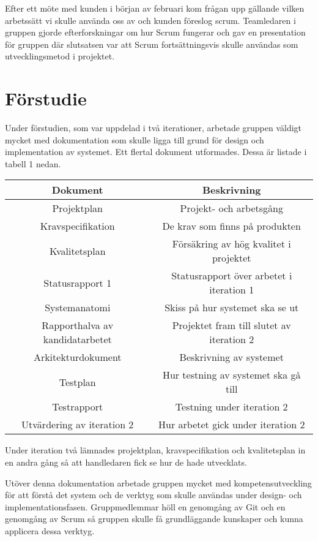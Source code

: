 Efter ett möte med kunden i början av februari kom frågan upp gällande vilken arbetssätt vi skulle använda oss av och kunden föreslog scrum. Teamledaren i gruppen gjorde efterforskningar om hur Scrum fungerar och gav en presentation för gruppen där slutsatsen var att Scrum fortsättningsvis skulle användas som utvecklingsmetod i projektet.

\section{Förstudie}
\label{sec:forstudie}
Under förstudien, som var uppdelad i två iterationer, arbetade gruppen väldigt mycket med dokumentation som skulle ligga till grund för design och implementation av systemet. Ett flertal dokument utformades. Dessa är listade i tabell 1 nedan.

\begin{center}
\begin{tabular}{|c|c|}
\hline
\textbf{Dokument} & \textbf{Beskrivning} \\
\hline
Projektplan & Projekt- och arbetsgång \\
\hline
Kravspecifikation & De krav som finns på produkten \\
\hline
Kvalitetsplan & Försäkring av hög kvalitet i projektet \\
\hline
Statusrapport 1 & Statusrapport över arbetet i iteration 1 \\
\hline
Systemanatomi & Skiss på hur systemet ska se ut \\
\hline
Rapporthalva av kandidatarbetet & Projektet fram till slutet av iteration 2 \\
\hline
Arkitekturdokument & Beskrivning av systemet \\
\hline
Testplan & Hur testning av systemet ska gå till \\
\hline
Testrapport & Testning under iteration 2 \\
\hline
Utvärdering av iteration 2 & Hur arbetet gick under iteration 2 \\
\hline
\end{tabular}
\end{center}

Under iteration två lämnades projektplan, kravspecifikation och kvalitetsplan in en andra gång så att handledaren fick se hur de hade utvecklats.

Utöver denna dokumentation arbetade gruppen mycket med kompetensutveckling för att förstå det system och de verktyg som skulle användas under design- och implementationsfasen. Gruppmedlemmar höll en genomgång av Git och en genomgång av Scrum så gruppen skulle få grundläggande kunskaper och kunna applicera dessa verktyg.


